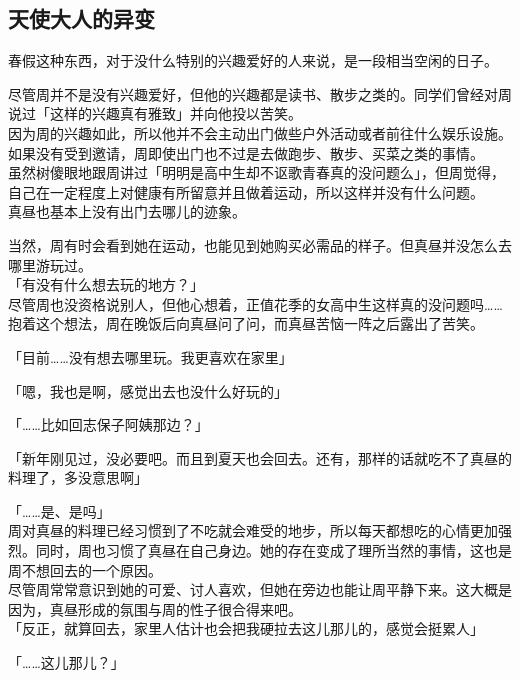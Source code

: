 \subsection{天使大人的异变}

春假这种东西，对于没什么特别的兴趣爱好的人来说，是一段相当空闲的日子。

尽管周并不是没有兴趣爱好，但他的兴趣都是读书、散步之类的。同学们曾经对周说过「这样的兴趣真有雅致」并向他投以苦笑。\\

因为周的兴趣如此，所以他并不会主动出门做些户外活动或者前往什么娱乐设施。如果没有受到邀请，周即使出门也不过是去做跑步、散步、买菜之类的事情。\\

虽然树傻眼地跟周讲过「明明是高中生却不讴歌青春真的没问题么」，但周觉得，自己在一定程度上对健康有所留意并且做着运动，所以这样并没有什么问题。\\

真昼也基本上没有出门去哪儿的迹象。

当然，周有时会看到她在运动，也能见到她购买必需品的样子。但真昼并没怎么去哪里游玩过。\\

「有没有什么想去玩的地方？」\\

尽管周也没资格说别人，但他心想着，正值花季的女高中生这样真的没问题吗……抱着这个想法，周在晚饭后向真昼问了问，而真昼苦恼一阵之后露出了苦笑。\

「目前……没有想去哪里玩。我更喜欢在家里」

「嗯，我也是啊，感觉出去也没什么好玩的」

「……比如回志保子阿姨那边？」

「新年刚见过，没必要吧。而且到夏天也会回去。还有，那样的话就吃不了真昼的料理了，多没意思啊」

「……是、是吗」\\

周对真昼的料理已经习惯到了不吃就会难受的地步，所以每天都想吃的心情更加强烈。同时，周也习惯了真昼在自己身边。她的存在变成了理所当然的事情，这也是周不想回去的一个原因。\\

尽管周常常意识到她的可爱、讨人喜欢，但她在旁边也能让周平静下来。这大概是因为，真昼形成的氛围与周的性子很合得来吧。\\

「反正，就算回去，家里人估计也会把我硬拉去这儿那儿的，感觉会挺累人」

「……这儿那儿？」

